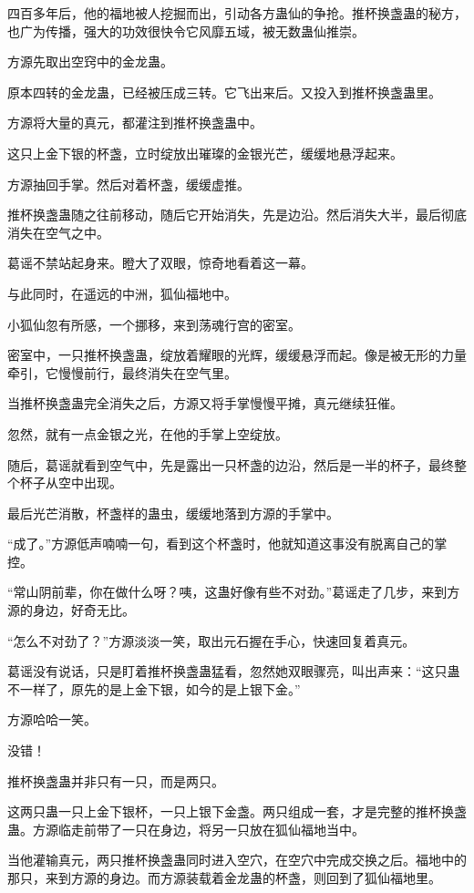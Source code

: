 \begin{this_body}
四百多年后，他的福地被人挖掘而出，引动各方蛊仙的争抢。推杯换盏蛊的秘方，也广为传播，强大的功效很快令它风靡五域，被无数蛊仙推崇。

方源先取出空窍中的金龙蛊。

原本四转的金龙蛊，已经被压成三转。它飞出来后。又投入到推杯换盏蛊里。

方源将大量的真元，都灌注到推杯换盏蛊中。

这只上金下银的杯盏，立时绽放出璀璨的金银光芒，缓缓地悬浮起来。

方源抽回手掌。然后对着杯盏，缓缓虚推。

推杯换盏蛊随之往前移动，随后它开始消失，先是边沿。然后消失大半，最后彻底消失在空气之中。

葛谣不禁站起身来。瞪大了双眼，惊奇地看着这一幕。

与此同时，在遥远的中洲，狐仙福地中。

小狐仙忽有所感，一个挪移，来到荡魂行宫的密室。

密室中，一只推杯换盏蛊，绽放着耀眼的光辉，缓缓悬浮而起。像是被无形的力量牵引，它慢慢前行，最终消失在空气里。

当推杯换盏蛊完全消失之后，方源又将手掌慢慢平摊，真元继续狂催。

忽然，就有一点金银之光，在他的手掌上空绽放。

随后，葛谣就看到空气中，先是露出一只杯盏的边沿，然后是一半的杯子，最终整个杯子从空中出现。

最后光芒消散，杯盏样的蛊虫，缓缓地落到方源的手掌中。

“成了。”方源低声喃喃一句，看到这个杯盏时，他就知道这事没有脱离自己的掌控。

“常山阴前辈，你在做什么呀？咦，这蛊好像有些不对劲。”葛谣走了几步，来到方源的身边，好奇无比。

“怎么不对劲了？”方源淡淡一笑，取出元石握在手心，快速回复着真元。

葛谣没有说话，只是盯着推杯换盏蛊猛看，忽然她双眼骤亮，叫出声来：“这只蛊不一样了，原先的是上金下银，如今的是上银下金。”

方源哈哈一笑。

没错！

推杯换盏蛊并非只有一只，而是两只。

这两只蛊一只上金下银杯，一只上银下金盏。两只组成一套，才是完整的推杯换盏蛊。方源临走前带了一只在身边，将另一只放在狐仙福地当中。

当他灌输真元，两只推杯换盏蛊同时进入空穴，在空穴中完成交换之后。福地中的那只，来到方源的身边。而方源装载着金龙蛊的杯盏，则回到了狐仙福地里。


\end{this_body}
